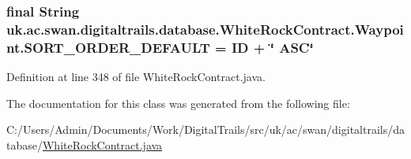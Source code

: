 \hypertarget{classuk_1_1ac_1_1swan_1_1digitaltrails_1_1database_1_1_white_rock_contract_1_1_waypoint_a54ae4eab6dd619ff5bf520d3c7c80542}{
\subsubsection[{S\+O\+R\+T\+\_\+\+O\+R\+D\+E\+R\+\_\+\+D\+E\+F\+A\+U\+L\+T}]{\setlength{\rightskip}{0pt plus 5cm}final String uk.\+ac.\+swan.\+digitaltrails.\+database.\+White\+Rock\+Contract.\+Waypoint.\+S\+O\+R\+T\+\_\+\+O\+R\+D\+E\+R\+\_\+\+D\+E\+F\+A\+U\+L\+T = I\+D + \char`\"{} A\+S\+C\char`\"{}\hspace{0.3cm}{\ttfamily [static]}}}\label{classuk_1_1ac_1_1swan_1_1digitaltrails_1_1database_1_1_white_rock_contract_1_1_waypoint_a54ae4eab6dd619ff5bf520d3c7c80542}


Definition at line 348 of file White\+Rock\+Contract.\+java.



The documentation for this class was generated from the following file\+:\begin{DoxyCompactItemize}
\item 
C\+:/\+Users/\+Admin/\+Documents/\+Work/\+Digital\+Trails/src/uk/ac/swan/digitaltrails/database/\hyperlink{_white_rock_contract_8java}{White\+Rock\+Contract.\+java}\end{DoxyCompactItemize}
